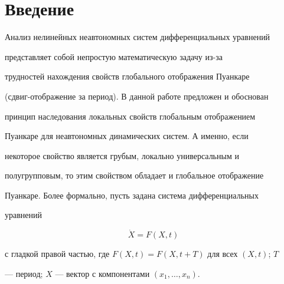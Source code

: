  


\date{} 




\pagestyle{plain} %


 




\maketitle 


\label{begin} 


 





\section*{Введение} 


 


Анализ нелинейных неавтономных систем дифференциальных уравнений 


представляет собой непростую математическую задачу из-за 


трудностей нахождения свойств глобального отображения Пуанкаре 


(сдвиг-отображение за период). В данной работе предложен и обоснован 


принцип наследования локальных свойств глобальным отображением 


Пуанкаре для неавтономных динамических систем. А именно, если 


некоторое свойство является грубым, локально универсальным и 


полугрупповым, то этим свойством обладает и глобальное отображение 


Пуанкаре. Более формально, пусть задана система дифференциальных 


уравнений 


\begin{equation} 


\Dot X=F(X,t) \tag{0.1} 


\end{equation} 


с гладкой правой частью, где $F(X,t)=F(X,t+T)$ для всех $(X,t)$; $T$ 


--- период; $X$ --- вектор с компонентами $(x_1,\dotsc,x_n)$. 


